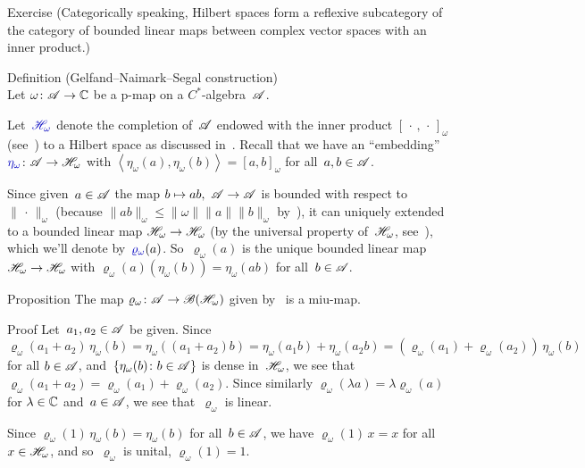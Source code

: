 \documentclass[a]{subfiles}
\begin{document}
\begin{parsec}
\begin{point}{Exercise}
(Categorically speaking,
Hilbert spaces
form a reflexive subcategory of
the category of bounded linear maps between
complex vector spaces with an inner product.)
\end{point}
\begin{point}[gns]{Definition (Gelfand--Naimark--Segal construction)}%
	\\
Let $\omega\colon \mathscr{A}\to\mathbb{C}$ be a p-map on a $C^*$-algebra~$\mathscr{A}$.

Let~$\Define{\scrH_\omega}$ denote the completion
of~$\mathscr{A}$ endowed with the inner product $[\,\cdot\,,\,\cdot\,]_\omega$
(see~)
to a Hilbert space as discussed in~.
Recall that we have an ``embedding''
$\Define{\eta_\omega}\colon \scrA\to\scrH_\omega$
with $\left<\eta_\omega(a),\eta_\omega(b)\right>
= [a,b]_\omega$ for all~$a,b\in \mathscr{A}$.

Since given~$a\in \mathscr{A}$
the map $b\mapsto ab,\ \mathscr{A}\to\mathscr{A}$ is
bounded with respect to~$\|\,\cdot\,\|_\omega$
(because $\|ab\|_\omega\leq \|\omega\|\|a\|\|b\|_\omega$
by~),
it can uniquely extended to a bounded linear map
$\mathscr{H}_\omega\to\mathscr{H}_\omega$
(by the universal property of~$\mathscr{H}_\omega$, 
see~),
which we'll denote by~$\Define{\varrho_\omega}(a)$.
So~$\varrho_\omega(a)$ is the unique
bounded linear map $\mathscr{H}_\omega\to\mathscr{H}_\omega$
with $\varrho_\omega(a)(\eta_\omega(b)) = \eta_\omega(ab)$
for all~$b\in\mathscr{A}$.
\end{point}
\begin{point}{Proposition}%
The map $\varrho_\omega\colon \mathscr{A}\to\mathscr{B}(\mathscr{H}_\omega)$
given by~ is a miu-map.
\begin{point}{Proof}%
Let~$a_1,a_2\in\mathscr{A}$ be given.
Since $\varrho_\omega(a_1+a_2)\,\eta_\omega(b)
= \eta_\omega((a_1+a_2)b)
= \eta_\omega(a_1b)+\eta_\omega(a_2b)
= (\varrho_\omega(a_1) + \varrho_\omega(a_2))\,\eta_\omega(b)$
for all $b\in\mathscr{A}$,
and~$\{\eta_\omega(b)\colon b\in\mathscr{A}\}$
is dense in~$\mathscr{H}_\omega$,
we see that $\varrho_\omega(a_1+a_2)
=\varrho_\omega(a_1)+\varrho_\omega(a_2)$.
Since similarly $\varrho_\omega(\lambda a)
= \lambda\varrho_\omega(a)$
for $\lambda\in\mathbb{C}$ and~$a\in\mathscr{A}$,
we see that~$\varrho_\omega$ is linear.

Since $\varrho_\omega(1)\,\eta_\omega(b)
= \eta_\omega(b)$ for all~$b\in\mathscr{A}$,
we have $\varrho_\omega(1)\,x=x$
for all~$x\in\mathscr{H}_\omega$,
and so~$\varrho_\omega$ is unital,
$\varrho_\omega(1)=1$.


\end{point}
\end{point}
\end{parsec}
\end{document}
